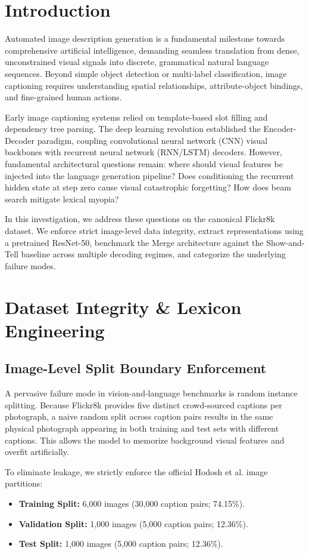 \documentclass[conference]{IEEEtran}
\begin{document}
\section{Introduction}
Automated image description generation is a fundamental milestone towards comprehensive artificial intelligence, demanding seamless translation from dense, unconstrained visual signals into discrete, grammatical natural language sequences. Beyond simple object detection or multi-label classification, image captioning requires understanding spatial relationships, attribute-object bindings, and fine-grained human actions.

Early image captioning systems relied on template-based slot filling and dependency tree parsing. The deep learning revolution established the Encoder-Decoder paradigm, coupling convolutional neural network (CNN) visual backbones with recurrent neural network (RNN/LSTM) decoders. However, fundamental architectural questions remain: where should visual features be injected into the language generation pipeline? Does conditioning the recurrent hidden state at step zero cause visual catastrophic forgetting? How does beam search mitigate lexical myopia?

In this investigation, we address these questions on the canonical Flickr8k dataset. We enforce strict image-level data integrity, extract representations using a pretrained ResNet-50, benchmark the Merge architecture against the Show-and-Tell baseline across multiple decoding regimes, and categorize the underlying failure modes.

\section{Dataset Integrity \& Lexicon Engineering}
\subsection{Image-Level Split Boundary Enforcement}
A pervasive failure mode in vision-and-language benchmarks is random instance splitting. Because Flickr8k provides five distinct crowd-sourced captions per photograph, a naive random split across caption pairs results in the same physical photograph appearing in both training and test sets with different captions. This allows the model to memorize background visual features and overfit artificially.

To eliminate leakage, we strictly enforce the official Hodosh et al. image partitions:
\begin{itemize}
    \item \textbf{Training Split:} 6,000 images (30,000 caption pairs; 74.15\%).
    \item \textbf{Validation Split:} 1,000 images (5,000 caption pairs; 12.36\%).
    \item \textbf{Test Split:} 1,000 images (5,000 caption pairs; 12.36\%).
\end{itemize}
\end{document}
